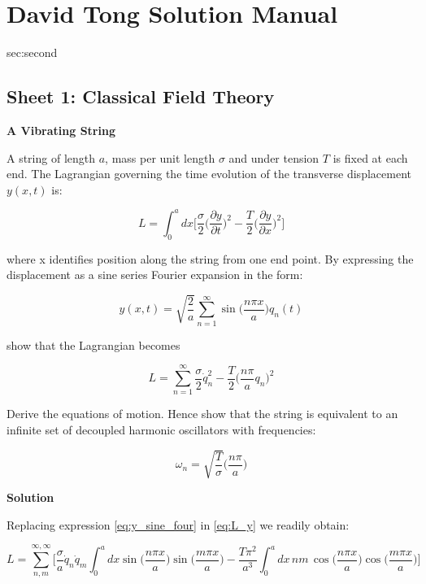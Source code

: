 \chapter{David Tong Solution Manual}
sec:second\label{sec:second}

\section{Sheet 1: Classical Field Theory}

\item \textbf{A Vibrating String}

A string of length $a$, mass per unit length $\sigma$ and under tension $T$ is fixed at each end. The Lagrangian governing the time evolution of the transverse displacement
$y(x, t)$ is:

\begin{equation}
L = \int_{0}^{a} dx \Bigg[ \frac{\sigma}{2} \bigg(\frac{\partial y}{\partial t}\bigg)^2 - \frac{T}{2} \bigg(\frac{\partial y}{\partial x}\bigg)^2  \Bigg] 
\label{eq:L_y}
\end{equation}

where x identifies position along the string from one end point. By expressing the displacement as a sine series Fourier expansion in the form:

\begin{equation}
y(x,t) = \sqrt{\frac{2}{a}}\sum_{n=1}^{\infty} \sin \bigg( \frac{n \pi x}{a}\bigg) q_n(t) 
\label{eq:y_sine_four}
\end{equation}

show that the Lagrangian becomes

\begin{equation}
L = \sum_{n=1}^{\infty} \frac{\sigma}{2} \dot{q}^2_n - \frac{T}{2} \bigg( \frac{n \pi }{a} q_n\bigg)^2
\label{eq:res_L}
\end{equation}

Derive the equations of motion. Hence show that the string is equivalent to an infinite
set of decoupled harmonic oscillators with frequencies:


\begin{equation}
\omega_n = \sqrt{\frac{T}{\sigma}} \bigg( \frac{n \pi}{a}\bigg)
\label{eq1:ex1_freq}
\end{equation}


\textbf{Solution}

Replacing expression \ref{eq:y_sine_four} in \ref{eq:L_y} we readily obtain:

\begin{equation}
L = \sum_{n, m}^{\infty, \infty}
\Bigg[ \frac{\sigma}{a} \dot{q}_n \dot{q}_m \int_{0}^{a} dx \sin \bigg( \frac{n \pi x}{a}\bigg) \sin \bigg( \frac{m \pi x}{a}\bigg)  - \frac{T\pi^2}{a^3} \int_{0}^{a} dx \,nm \, \cos \bigg( \frac{n \pi x}{a}\bigg) \cos \bigg( \frac{m \pi x}{a}\bigg)  \Bigg] 
\label{eq:step1}
\end{equation}

